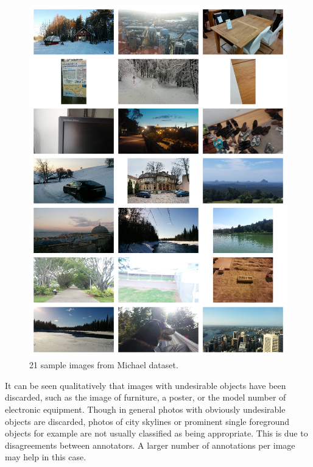 \begin{figure}
\centering\includegraphics[width=0.9\columnwidth]{../figures/grid7x3_out1.png}
\caption{21 sample images from Michael dataset.\label{fig:selection_out1}}
\end{figure}

It can be seen qualitatively that images with undesirable objects have been
discarded, such as the image of furniture, a poster, or the model number
of electronic equipment.
Though in general photos with obviously undesirable objects are discarded, photos of city skylines or prominent single foreground objects for example are not usually classified as being appropriate.
This is due to disagreements between annotators.
A larger number of annotations per image may help in this case.

